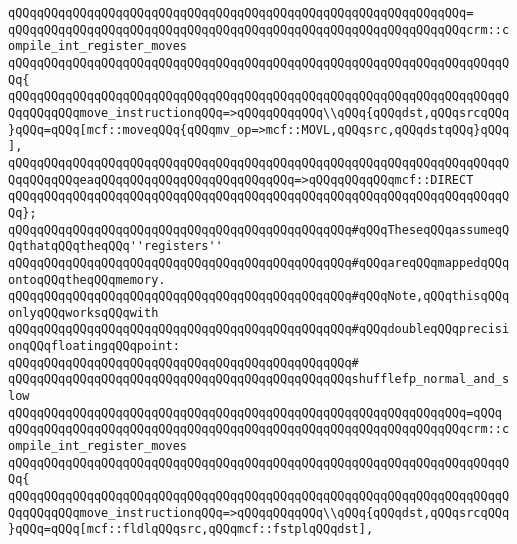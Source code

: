 \verb|qQQqqQQqqQQqqQQqqQQqqQQqqQQqqQQqqQQqqQQqqQQqqQQqqQQqqQQqqQQqqQQq=|\newline
\verb|qQQqqQQqqQQqqQQqqQQqqQQqqQQqqQQqqQQqqQQqqQQqqQQqqQQqqQQqqQQqqQQqcrm::compile_int_register_moves|\newline
\verb|qQQqqQQqqQQqqQQqqQQqqQQqqQQqqQQqqQQqqQQqqQQqqQQqqQQqqQQqqQQqqQQqqQQqqQQq{|\newline
\verb|qQQqqQQqqQQqqQQqqQQqqQQqqQQqqQQqqQQqqQQqqQQqqQQqqQQqqQQqqQQqqQQqqQQqqQQqqQQqqQQqmove_instructionqQQq=>qQQqqQQqqQQq\\qQQq{qQQqdst,qQQqsrcqQQq}qQQq=qQQq[mcf::moveqQQq{qQQqmv_op=>mcf::MOVL,qQQqsrc,qQQqdstqQQq}qQQq],|\newline
\verb|qQQqqQQqqQQqqQQqqQQqqQQqqQQqqQQqqQQqqQQqqQQqqQQqqQQqqQQqqQQqqQQqqQQqqQQqqQQqqQQqeaqQQqqQQqqQQqqQQqqQQqqQQqqQQq=>qQQqqQQqqQQqmcf::DIRECT|\newline
\verb|qQQqqQQqqQQqqQQqqQQqqQQqqQQqqQQqqQQqqQQqqQQqqQQqqQQqqQQqqQQqqQQqqQQqqQQq};|\newline
\newline
\verb|qQQqqQQqqQQqqQQqqQQqqQQqqQQqqQQqqQQqqQQqqQQqqQQq#qQQqTheseqQQqassumeqQQqthatqQQqtheqQQq''registers''|\newline
\verb|qQQqqQQqqQQqqQQqqQQqqQQqqQQqqQQqqQQqqQQqqQQqqQQq#qQQqareqQQqmappedqQQqontoqQQqtheqQQqmemory.|\newline
\newline
\verb|qQQqqQQqqQQqqQQqqQQqqQQqqQQqqQQqqQQqqQQqqQQqqQQq#qQQqNote,qQQqthisqQQqonlyqQQqworksqQQqwith|\newline
\verb|qQQqqQQqqQQqqQQqqQQqqQQqqQQqqQQqqQQqqQQqqQQqqQQq#qQQqdoubleqQQqprecisionqQQqfloatingqQQqpoint:|\newline
\verb|qQQqqQQqqQQqqQQqqQQqqQQqqQQqqQQqqQQqqQQqqQQqqQQq#|\newline
\verb|qQQqqQQqqQQqqQQqqQQqqQQqqQQqqQQqqQQqqQQqqQQqqQQqshufflefp_normal_and_slow|\newline
\verb|qQQqqQQqqQQqqQQqqQQqqQQqqQQqqQQqqQQqqQQqqQQqqQQqqQQqqQQqqQQqqQQq=qQQq|\newline
\verb|qQQqqQQqqQQqqQQqqQQqqQQqqQQqqQQqqQQqqQQqqQQqqQQqqQQqqQQqqQQqqQQqcrm::compile_int_register_moves|\newline
\verb|qQQqqQQqqQQqqQQqqQQqqQQqqQQqqQQqqQQqqQQqqQQqqQQqqQQqqQQqqQQqqQQqqQQqqQQq{|\newline
\verb|qQQqqQQqqQQqqQQqqQQqqQQqqQQqqQQqqQQqqQQqqQQqqQQqqQQqqQQqqQQqqQQqqQQqqQQqqQQqqQQqmove_instructionqQQq=>qQQqqQQqqQQq\\qQQq{qQQqdst,qQQqsrcqQQq}qQQq=qQQq[mcf::fldlqQQqsrc,qQQqmcf::fstplqQQqdst],|\newline
